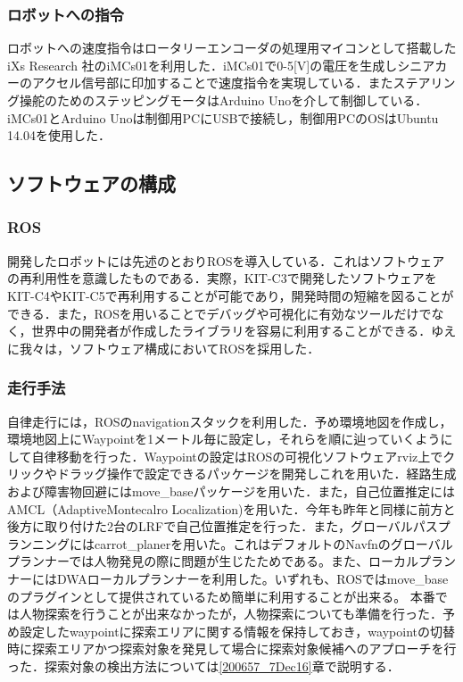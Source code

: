 \documentclass[10pt,a4paper]{jarticle}
\begin{document}
\subsubsection{ロボットへの指令}
ロボットへの速度指令はロータリーエンコーダの処理用マイコンとして搭載した iXs Research 社のiMCs01を利用した．iMCs01で0-5[V]の電圧を生成しシニアカーのアクセル信号部に印加することで速度指令を実現している．またステアリング操舵のためのステッピングモータはArduino Unoを介して制御している．iMCs01とArduino Unoは制御用PCにUSBで接続し，制御用PCのOSはUbuntu 14.04を使用した．

\subsection{ソフトウェアの構成}
\subsubsection{ROS}
開発したロボットには先述のとおりROSを導入している．これはソフトウェアの再利用性を意識したものである．実際，KIT-C3で開発したソフトウェアをKIT-C4やKIT-C5で再利用することが可能であり，開発時間の短縮を図ることができる．また，ROSを用いることでデバッグや可視化に有効なツールだけでなく，世界中の開発者が作成したライブラリを容易に利用することができる．ゆえに我々は，ソフトウェア構成においてROSを採用した．

\subsubsection{走行手法}
自律走行には，ROSのnavigationスタックを利用した．予め環境地図を作成し，環境地図上にWaypointを1メートル毎に設定し，それらを順に辿っていくようにして自律移動を行った．Waypointの設定はROSの可視化ソフトウェアrviz上でクリックやドラッグ操作で設定できるパッケージを開発しこれを用いた．経路生成および障害物回避にはmove\_baseパッケージを用いた．また，自己位置推定にはAMCL（AdaptiveMontecalro Localization)を用いた．今年も昨年と同様に前方と後方に取り付けた2台のLRFで自己位置推定を行った．また，グローバルパスプランニングにはcarrot\_planerを用いた。これはデフォルトのNavfnのグローバルプランナーでは人物発見の際に問題が生じたためである。また、ローカルプランナーにはDWAローカルプランナーを利用した。いずれも、ROSではmove\_baseのプラグインとして提供されているため簡単に利用することが出来る。
本番では人物探索を行うことが出来なかったが，人物探索についても準備を行った．予め設定したwaypointに探索エリアに関する情報を保持しておき，waypointの切替時に探索エリアかつ探索対象を発見して場合に探索対象候補へのアプローチを行った．探索対象の検出方法については\ref{200657_7Dec16}章で説明する．
\end{document}
